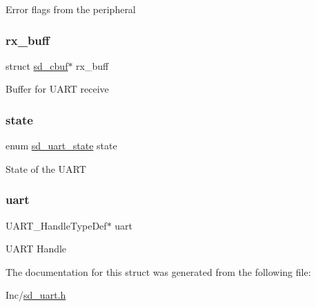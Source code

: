 Error flags from the peripheral \mbox{\label{structsd__uart__dev_a2bc17c33f4234299b83ba5d98edd5887}} 
\subsubsection{\texorpdfstring{rx\+\_\+buff}{rx\_buff}}
{\footnotesize\ttfamily struct \mbox{\hyperlink{structsd__cbuf}{sd\+\_\+cbuf}}$\ast$ rx\+\_\+buff}

Buffer for U\+A\+RT receive \mbox{\label{structsd__uart__dev_a446351924c8cae5f6254f777f8924cd2}} 
\subsubsection{\texorpdfstring{state}{state}}
{\footnotesize\ttfamily enum \mbox{\hyperlink{group___s_d___u_a_r_t___types_gaf0b8536f812b898a674880b74843b6da}{sd\+\_\+uart\+\_\+state}} state}

State of the U\+A\+RT \mbox{\label{structsd__uart__dev_a31b2a452cffe839ac4a3bf86eddc16b0}} 
\subsubsection{\texorpdfstring{uart}{uart}}
{\footnotesize\ttfamily U\+A\+R\+T\+\_\+\+Handle\+Type\+Def$\ast$ uart}

U\+A\+RT Handle 

The documentation for this struct was generated from the following file\+:\begin{DoxyCompactItemize}
\item 
Inc/\mbox{\hyperlink{sd__uart_8h}{sd\+\_\+uart.\+h}}\end{DoxyCompactItemize}
